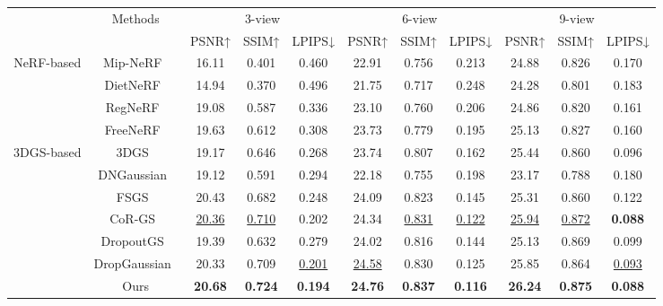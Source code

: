 \begin{tabular}{c|c|ccc|ccc|ccc}
\toprule
      & \multirow{2}[4]{*}{Methods} & \multicolumn{3}{c|}{3-view} & \multicolumn{3}{c|}{6-view} & \multicolumn{3}{c}{9-view} \\
\cmidrule{3-11}      &       & PSNR↑ & SSIM↑ & LPIPS↓ & PSNR↑ & SSIM↑ & LPIPS↓ & PSNR↑ & SSIM↑ & LPIPS↓ \\
\midrule
\multirow{4}[2]{*}{NeRF-based} & Mip-NeRF~\cite{barron2022mipnerf-360} & 16.11 & 0.401 & 0.460  & 22.91 & 0.756 & 0.213 & 24.88 & 0.826 & 0.170  \\
      & DietNeRF~\cite{jain2021dietnerf} & 14.94 & 0.370  & 0.496 & 21.75 & 0.717 & 0.248 & 24.28 & 0.801 & 0.183 \\
      & RegNeRF~\cite{niemeyer2022regnerf} & 19.08 & 0.587 & 0.336 & 23.10  & 0.760  & 0.206 & 24.86 & 0.820  & 0.161 \\
      & FreeNeRF~\cite{yang2023freenerf} & 19.63 & 0.612 & 0.308 & 23.73 & 0.779 & 0.195 & 25.13 & 0.827 & 0.160  \\
\midrule
\multirow{7}[4]{*}{3DGS-based} & 3DGS~\cite{kerbl2023-3dgs}  & 19.17 & 0.646 & 0.268 & 23.74  & 0.807  & 0.162 & 25.44 & 0.860  & 0.096 \\
      & DNGaussian~\cite{li2024dngaussian} & 19.12 & 0.591 & 0.294 & 22.18 & 0.755 & 0.198 & 23.17 & 0.788 & 0.180  \\
      & FSGS~\cite{zhu2024fsgs}  & 20.43 & 0.682 & 0.248 & 24.09 & 0.823 & 0.145 & 25.31 & 0.860  & 0.122 \\
      & CoR-GS~\cite{zhang2024corgs} & \underline{20.36} & \underline{0.710} & 0.202 & 24.34 & \underline{0.831} & \underline{0.122} & \underline{25.94} & \underline{0.872} & \textbf{0.088} \\
\cmidrule{2-11}      & DropoutGS~\cite{xu2025Dropoutgs} & 19.39 & 0.632 & 0.279 & 24.02 & 0.816 & 0.144 & 25.13 & 0.869 & 0.099 \\
      & DropGaussian~\cite{park2025dropgaussian} & 20.33 & 0.709 & \underline{0.201} & \underline{24.58} & 0.830  & 0.125  & 25.85 & 0.864 & \underline{0.093} \\
      & Ours  & \textbf{20.68} & \textbf{0.724} & \textbf{0.194} & \textbf{24.76 } & \textbf{0.837} & \textbf{0.116} & \textbf{26.24 } & \textbf{0.875} & \textbf{0.088} \\
\bottomrule
\end{tabular}%
